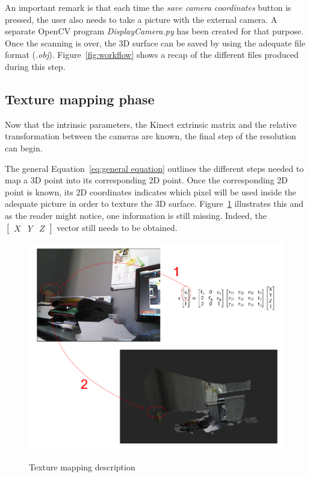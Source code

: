 An important remark is that each time the \textit{save camera coordinates} button is pressed, the user also needs to take a picture with the external camera. A separate OpenCV program \textit{DisplayCamera.py} has been created for that purpose.\\

Once the scanning is over, the 3D surface can be saved by using the adequate file format (\textit{.obj}). Figure~\ref{fig:workflow} shows a recap of the different files produced during this step.

\subsection{Texture mapping phase} 
\label{sec:Texture mapping phase}
Now that the intrinsic parameters, the Kinect extrinsic matrix and the relative transformation between the cameras are known, the final step of the resolution can begin.

The general Equation~\ref{eq:general equation} outlines the different steps needed to map a 3D point into its corresponding 2D point. Once the corresponding 2D point is known, its 2D coordinates indicates which pixel will be used inside the adequate picture in order to texture the 3D surface. Figure~\ref{fig:Texture mapping description} illustrates this and as the reader might notice, one information is still missing. Indeed, the $\left[ \begin{smallmatrix} X & Y & Z \end{smallmatrix} \right]$ vector still needs to be obtained.\\

\begin{figure}
\caption{Texture mapping description}
\centering
    \includegraphics[width=1.0\textwidth]{images/mappingDescription.png}
\label{fig:Texture mapping description}
\end{figure}

